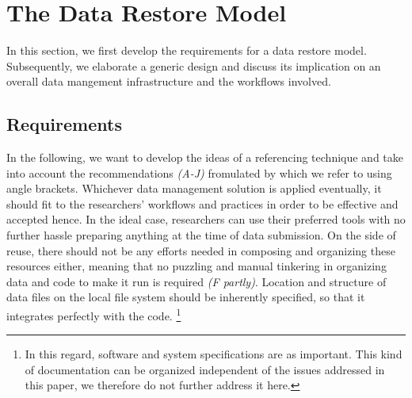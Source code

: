 \documentclass{acm_proc_article-sp}
\begin{document}
\section{The Data Restore Model}\label{sec:datareferencing}

In this section, we first develop the requirements for a data restore model.
Subsequently, we elaborate a generic design and discuss its implication on an overall data mangement infrastructure and the workflows involved.


\subsection{Requirements}\label{sec:req}

In the following, we want to develop the ideas of a referencing technique and take into account the recommendations \textit{(A-J)} fromulated by \cite{RePEc_ejw_journl_v_4_y_2007_i_3_p_326_337} which we refer to using angle brackets.
Whichever data management solution is applied eventually, it should fit to the researchers' workflows and practices in order to be effective and accepted hence.
\cite{Feijen_2011} 
In the ideal case, researchers can use their preferred tools with no further hassle preparing anything at the time of data submission.
%
On the side of reuse, there should not be any efforts needed in composing and organizing these resources either, meaning that no puzzling and manual tinkering in organizing data and code to make it run is required \textit{(F partly)}.
Location and structure of data files on the local file system should be inherently specified, so that it integrates perfectly with the code.
\footnote{In this regard, software and system specifications are as important. This kind of documentation can be organized independent of the issues addressed in this paper, we therefore do not further address it here.}
  
\end{document}
